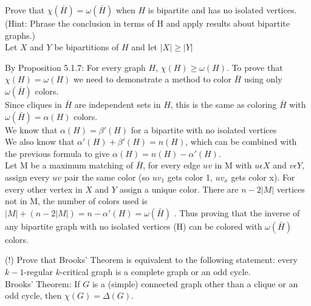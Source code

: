 \documentclass[12pt]{article}
\newenvironment{question}[2][Question]{\begin{trivlist}
\item[\hskip \labelsep {\bfseries #1}\hskip \labelsep {\bfseries #2.}]}{\end{trivlist}}
\begin{document}
\begin{question}{4}
Prove that $\chi(\bar{H}) = \omega(\bar{H})$ when $H$ is bipartite and has no isolated vertices. (Hint: Phrase the conclusion in terms of H and apply results about bipartite graphs.)\\

Let $X$ and $Y$ be bipartitions of $H$ and let $|X| \geq |Y| $

By Proposition 5.1.7: For every graph $H$, $\chi(H)\geq\omega(H)$. To prove that $\chi(H)= \omega(H)$ we need to demonstrate a method to color $\bar{H}$ using only $\omega(\bar{H})$ colors.\\

Since cliques in $\bar{H}$ are independent sets in $H$, this is the same as coloring $\bar{H}$ with $\omega(\bar{H}) =  \alpha(H)$ colors.\\ 

We know that $\alpha(H) = \beta'(H)$ for a bipartite with no isolated vertices\\

We also know that $\alpha'(H) + \beta'(H) = n(H)$, which can be combined with the previous formula to give $\alpha(H) = n(H)-\alpha'(H)$. \\

Let M be a maximum matching of $\bar{H}$, for every edge $uv$ in M with $u \epsilon X$ and $v \epsilon Y$, assign every $uv$ pair the same color (so ${uv}_1$ gets color 1, ${uv}_x$ gets color x). For every other vertex in $X$ and $Y$ assign a unique color. There are $n-2|M|$ vertices not in M, the number of colors used is $|M| + (n-2|M|) = n - \alpha'(H) = \omega(\bar{H})$ . Thus proving that the inverse of any bipartite graph with no isolated vertices (H) can be colored with $\omega(\bar{H})$ colors.

\end{question}

\begin{question}{5}
(!) Prove that Brooks' Theorem is equivalent to the following statement: every $k-1$-regular $k$-critical graph is a complete graph or an odd cycle.\\

Brooks' Theorem:
If $G$ is a (simple) connected graph other than a clique or an odd cycle, then $\chi(G) = \Delta(G)$.
\end{question}





\end{document}
